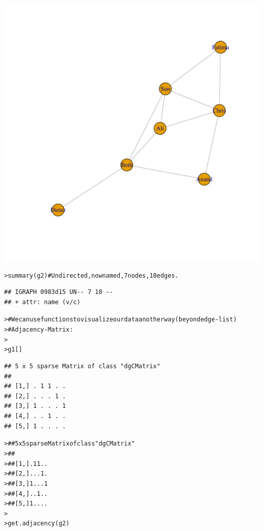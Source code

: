 \documentclass[12pt]{article}\usepackage[]{graphicx}\usepackage[]{color}
\makeatletter
\newcommand{\hlcom}[1]{\textcolor[rgb]{0.404,0.408,0.42}{#1}}%
\newcommand{\hlstd}[1]{\textcolor[rgb]{0.882,0.878,0.898}{#1}}%
\newcommand{\hlkwd}[1]{\textcolor[rgb]{0.733,0.388,0.812}{#1}}%
\newenvironment{kframe}{%
 \def\at@end@of@kframe{}%
 \ifinner\ifhmode%
  \def\at@end@of@kframe{\end{minipage}}%
  \begin{minipage}{\columnwidth}%
 \fi\fi%
 \def\FrameCommand##1{\hskip\@totalleftmargin \hskip-\fboxsep
 \colorbox{shadecolor}{##1}\hskip-\fboxsep
     \hskip-\linewidth \hskip-\@totalleftmargin \hskip\columnwidth}%
 \MakeFramed {\advance\hsize-\width
   \@totalleftmargin\z@ \linewidth\hsize
   \@setminipage}}%
 {\par\unskip\endMakeFramed%
 \at@end@of@kframe}
\newenvironment{knitrout}{}{} %
\makeatother
\begin{document}
\begin{flushleft}
\begin{center}
\begin{knitrout}
\includegraphics[width=6in]{figure/Network_Basics-2} 
\begin{kframe}\begin{alltt}
\hlstd{> }\hlkwd{summary}\hlstd{(g2)} \hlcom{# Undirected, now named, 7 nodes, 10 edges.}
\end{alltt}
\begin{verbatim}
## IGRAPH 0983d15 UN-- 7 10 -- 
## + attr: name (v/c)
\end{verbatim}
\begin{alltt}
\hlstd{> }\hlcom{# We can use functions to visualize our data another way (beyond edge-list)}
\hlstd{> }\hlcom{# Adjacency-Matrix:}
\hlstd{> }
\hlstd{> }\hlstd{g1[]}
\end{alltt}
\begin{verbatim}
## 5 x 5 sparse Matrix of class "dgCMatrix"
##               
## [1,] . 1 1 . .
## [2,] . . . 1 .
## [3,] 1 . . . 1
## [4,] . . 1 . .
## [5,] 1 . . . .
\end{verbatim}
\begin{alltt}
\hlstd{> }\hlcom{## 5 x 5 sparse Matrix of class "dgCMatrix"}
\hlstd{> }\hlcom{##}
\hlstd{> }\hlcom{## [1,] . 1 1 . .}
\hlstd{> }\hlcom{## [2,] . . . 1 .}
\hlstd{> }\hlcom{## [3,] 1 . . . 1}
\hlstd{> }\hlcom{## [4,] . . 1 . .}
\hlstd{> }\hlcom{## [5,] 1 . . . .}
\hlstd{> }
\hlstd{> }\hlkwd{get.adjacency}\hlstd{(g2)}
\end{alltt}

\end{kframe}
\end{knitrout}
\end{center}
\end{flushleft}
\end{document}
